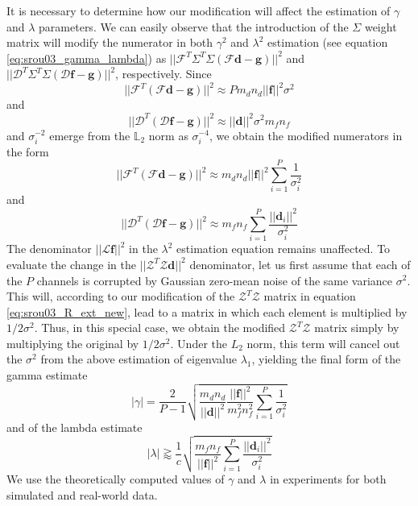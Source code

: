 \documentclass[12pt,notitlepage]{report}
\begin{document}
It is necessary to determine how our modification will affect the estimation of $\gamma$ and $\lambda$ parameters. We can easily observe that the introduction of the $\Sigma$ weight matrix will 
modify the numerator in both $\gamma^2$ and $\lambda^2$ estimation (see equation \ref{eq:srou03_gamma_lambda}) as $||\mathcal{F}^T \Sigma^T \Sigma( \mathcal{F} \mathbf{d} - \mathbf{g}) ||^2$ and $||\mathcal{D}^T \Sigma^T \Sigma( \mathcal{D} \mathbf{f} - \mathbf{g}) ||^2$, respectively. Since 
\begin{equation}
\label{eq:srou03_lambda_numer}
	||\mathcal{F}^T(\mathcal{F} \mathbf{d} - \mathbf{g}) ||^2 \approx P m_d n_d ||\mathbf{f}||^2 \sigma^2
\end{equation}
and 
\begin{equation}
\label{eq:srou03_gamma_numer}
	||\mathcal{D}^T (\mathcal{D} \mathbf{f} - \mathbf{g}) ||^2 \approx || \mathbf{d} ||^2 \sigma^2 m_f n_f
\end{equation}
and $\sigma_i^{-2}$ emerge from the $\mathbb{L}_2$ norm as $\sigma_i^{-4}$, we obtain the modified numerators in the form    
\begin{equation}
\label{eq:srou03_lambda_numer_ext}
	||\mathcal{F}^T(\mathcal{F} \mathbf{d} - \mathbf{g}) ||^2 \approx m_d n_d ||\mathbf{f}||^2 \sum_{i=1}^{P} \frac{1}{\sigma_i^2} 
\end{equation}
and 
\begin{equation}
\label{eq:srou03_gamma_numer_ext}
	||\mathcal{D}^T (\mathcal{D} \mathbf{f} - \mathbf{g}) ||^2 \approx  m_f n_f \sum_{i=1}^P \frac {|| \mathbf{d}_i ||^2}{ \sigma_i^2}
\end{equation}
The denominator $|| \mathcal{L} \mathbf{f} ||^2$ in the $\lambda^2$ estimation equation remains unaffected. To evaluate the change in the $|| \mathcal{Z}^T \mathcal{Z} \mathbf{d} ||^2$ denominator, let us first assume that each of the $P$ channels is corrupted by Gaussian zero-mean noise of the same variance $\sigma^2$. This will, according to our modification of the $\mathcal{Z}^T \mathcal{Z}$ matrix in equation \ref{eq:srou03_R_ext_new}, lead to a matrix in which each element is multiplied by $1/2\sigma^2$. Thus, in this special case, we obtain the modified $\mathcal{Z}^T \mathcal{Z}$ matrix simply by multiplying the original by $1/2\sigma^2$. Under the $L_2$ norm, this term will cancel out the $\sigma^2$ from the above estimation of eigenvalue $\lambda_1$, yielding the final form of the gamma estimate
\begin{equation}
\label{eq:srou03_gamma_estimate_ext}
	|\gamma| = \frac{2}{P - 1} \sqrt{ \frac{m_d n_d}{|| \mathbf{d} ||^2} \frac{||\mathbf{f}||^2}{m_f^2 n_f^2} \sum_{i=1}^{P} \frac{1}{\sigma_i^2} }
\end{equation}
and of the lambda estimate
\begin{equation}
\label{eq:srou03_lambda_estimate_ext}
	|\lambda| \gtrapprox \frac{1}{c} \sqrt{ \frac{m_f n_f}{||\mathbf{f}||^2} \sum_{i=1}^{P}\frac{||\mathbf{d}_i||^2}{\sigma_i^2}}
\end{equation}
We use the theoretically computed values of $\gamma$ and $\lambda$ in experiments for both simulated and real-world data.  
\end{document}
